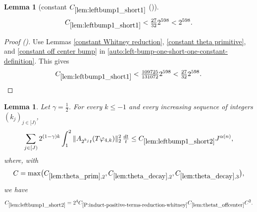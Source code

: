 \documentclass[12pt,reqno]{amsart}
\newcommand{\auto}{{({\tiny\faCar})}}
\theoremstyle{plain}
\newtheorem{lemma}[theorem]{Lemma}
\numberwithin{equation}{section}
\theoremstyle{remark}
\newcommand{\using}[1]{}
\begin{document}
\begin{lemma}[constant $C_{\ref{lem:leftbump1_short1}}$ \auto]\label{constant left bump one short one}\using{constant Whitney reduction}\using{constant theta primitive}\using{constant off center bump}\using{lem:leftbump1_short1}
\begin{equation}\label{constant left bump one short one bound}
C_{\ref{lem:leftbump1_short1}}<\tfrac{27}{32}2^{598}<2^{598}.
\end{equation}
\end{lemma}
\begin{proof}[Proof \auto]
Use Lemmas \ref{constant Whitney reduction}, \ref{constant theta primitive}, and \ref{constant off center bump} in \eqref{auto:left-bump-one-short-one-constant-definition}. This gives
\[
C_{\ref{lem:leftbump1_short1}}
<\tfrac{109725}{131072}2^{598}
<\tfrac{27}{32}2^{598}.
\]
\end{proof}


\begin{lemma}\label{lem:leftbump1_short2}\using{A to Lambda}\using{lem:theta_prim}\using{lem:theta_decay}\using{lem:thetat_offcenter}\using{P:induct-positive-terms-reduction-whitney}\using{lem:int_fct}\using{lem:phi4_supp}\using{lem:ft_deriv_mul}
Let $\gamma=\frac12$. For every $k\le-1$ and every increasing sequence of integers $(k_j)_{j\in[J)}$,
\begin{equation}\label{auto:left-bump-one-short-two-bound}
\sum_{j\in[J)}2^{(1-\gamma)k}\int_1^2
\|A_{2^{k_j}t}(T\varphi_{4,k})\|_2^2\,\tfrac{dt}{t}
\le C_{\ref{lem:leftbump1_short2}}J^{\alpha(n)},
\end{equation}
where, with
\begin{equation}\label{auto:left-bump-one-short-two-auxiliary-constant}
C=\max\bigl(C_{\ref{lem:theta_prim},2},C_{\ref{lem:theta_decay},2},C_{\ref{lem:theta_decay},3}\bigr),
\end{equation}
we have
\begin{equation}\label{auto:left-bump-one-short-two-constant-definition}
C_{\ref{lem:leftbump1_short2}}
=2^4C_{\ref{P:induct-positive-terms-reduction-whitney}}
C_{\ref{lem:thetat_offcenter}}C^2.
\end{equation}
\end{lemma}
\end{document}
